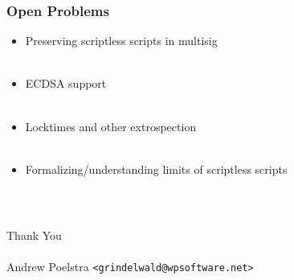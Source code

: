 \documentclass{beamer}
\begin{document}
\frame
{
  \frametitle{Open Problems}
  \begin{itemize}
  \item Preserving scriptless scripts in multisig\\~\\
  \item ECDSA support\\~\\
  \item Locktimes and other extrospection\\~\\
  \item Formalizing/understanding limits of scriptless scripts
  \end{itemize}
}

\frame
{
  \frametitle{~}

  \begin{center}
  Thank You
  ~\\~\\
  Andrew Poelstra \texttt{<grindelwald@wpsoftware.net>}
  \end{center}
}
\end{document}
